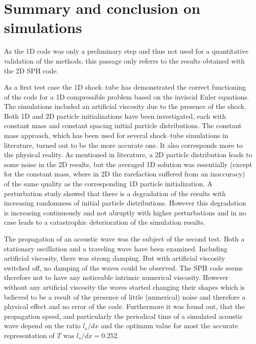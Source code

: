 \documentclass[11pt,a4paper,twoside]{report}
\begin{document}
\section{Summary and conclusion on simulations}
\label{sec:SummaryConclusionSimuResults}
As the 1D code  was only a preliminary step and thus not used for a quantitative validation of the methods, this passage only referrs to the results obtained with the 2D SPH code.

As a first test case the 1D shock--tube has demonstrated the correct functioning of the code for a 1D compressible problem based on the inviscid Euler equations. The simulations included an artificial viscosity due to the presence of the shock. Both 1D and 2D particle initializations have been investigated, each with constant mass and constant spacing initial particle distributions. The constant mass approach, which has been used for several shock--tube simulations in literature, turned out to be the more accurate one. It also corresponds more to the physical reality. As mentioned in literature, a 2D particle distribution leads to some noise in the 2D results, but the averaged 1D solution was essentially (except for the constant mass, where in 2D the rarefaction suffered from an inaccuracy) of the same quality as the corresponding 1D particle initialization. A perturbation study showed that there is a degradation of the results with increasing randomness of initial particle distributions. However this degradation is increasing continuously and not abruptly with higher perturbations and in no case leads to a catastrophic deterioration of the simulation results.

The propagation of an acoustic wave was the subject of the second test. Both a stationary oscillation and a traveling wave have been examined. Including artificial viscosity, there was strong damping. But with artificial viscosity switched off, no damping of the waves could be observed. The SPH code seems therefore not to have any noticeable intrinsic numerical viscosity. However without any artificial viscosity the waves started changing their shapes which is believed to be a result of the presence of little (numerical) noise and therefore a physical effect and no error of the code. Furthermore it was found out, that the propagation speed, and particularly the periodical time of a simulated acoustic wave depend on the ratio $l_s/dx$ and the optimum value for most the accurate representation of $T$ was $l_s/dx=0.252$. %
\end{document}
